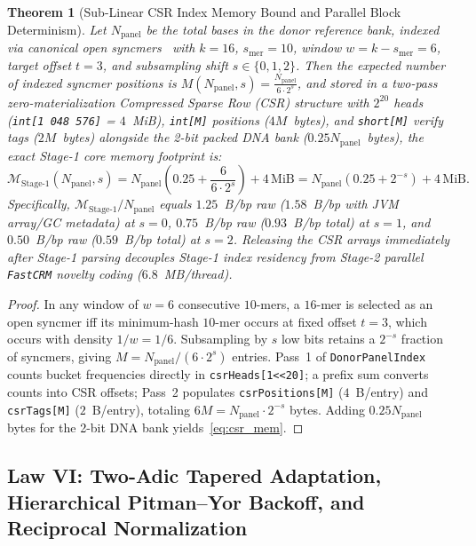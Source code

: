 \documentclass[10pt]{article}
\newtheorem{theorem}{Theorem}
\theoremstyle{definition}
\begin{document}
\begin{theorem}[Sub-Linear CSR Index Memory Bound and Parallel Block Determinism]
\label{thm:law5}
Let $N_{\text{panel}}$ be the total bases in the donor reference bank, indexed via canonical open syncmers~\cite{edgar2021syncmers} with $k=16$, $s_{\text{mer}}=10$, window $w = k - s_{\text{mer}} = 6$, target offset $t = 3$, and subsampling shift $s \in \{0,1,2\}$. Then the expected number of indexed syncmer positions is $M(N_{\text{panel}}, s) = \frac{N_{\text{panel}}}{6 \cdot 2^s}$, and stored in a two-pass zero-materialization Compressed Sparse Row (CSR) structure with $2^{20}$ heads (\texttt{int[1\,048\,576]} = $4$~MiB), \texttt{int[M]} positions ($4M$~bytes), and \texttt{short[M]} verify tags ($2M$~bytes) alongside the 2-bit packed DNA bank ($0.25 N_{\text{panel}}$~bytes), the exact Stage-1 core memory footprint is:
\begin{equation}
  \mathcal{M}_{\text{Stage-1}}(N_{\text{panel}}, s) = N_{\text{panel}} \left(0.25 + \frac{6}{6 \cdot 2^s}\right) + 4\,\text{MiB} = N_{\text{panel}} \left(0.25 + 2^{-s}\right) + 4\,\text{MiB}.
  \label{eq:csr_mem}
\end{equation}
Specifically, $\mathcal{M}_{\text{Stage-1}}/N_{\text{panel}}$ equals $1.25$~B/bp raw ($1.58$~B/bp with JVM array/GC metadata) at $s=0$, $0.75$~B/bp raw ($0.93$~B/bp total) at $s=1$, and $0.50$~B/bp raw ($0.59$~B/bp total) at $s=2$. Releasing the CSR arrays immediately after Stage-1 parsing decouples Stage-1 index residency from Stage-2 parallel \texttt{FastCRM} novelty coding ($6.8$~MB/thread).
\end{theorem}
\begin{proof}
In any window of $w = 6$ consecutive $10$-mers, a $16$-mer is selected as an open syncmer iff its minimum-hash $10$-mer occurs at fixed offset $t=3$, which occurs with density $1/w = 1/6$. Subsampling by $s$ low bits retains a $2^{-s}$ fraction of syncmers, giving $M = N_{\text{panel}} / (6 \cdot 2^s)$ entries. Pass~1 of \texttt{DonorPanelIndex} counts bucket frequencies directly in \texttt{csrHeads[1<<20]}; a prefix sum converts counts into CSR offsets; Pass~2 populates \texttt{csrPositions[M]} ($4$~B/entry) and \texttt{csrTags[M]} ($2$~B/entry), totaling $6M = N_{\text{panel}} \cdot 2^{-s}$ bytes. Adding $0.25 N_{\text{panel}}$ bytes for the 2-bit DNA bank yields~\eqref{eq:csr_mem}.
\end{proof}

\subsection{Law VI: Two-Adic Tapered Adaptation, Hierarchical Pitman--Yor Backoff, and Reciprocal Normalization}
\end{document}
